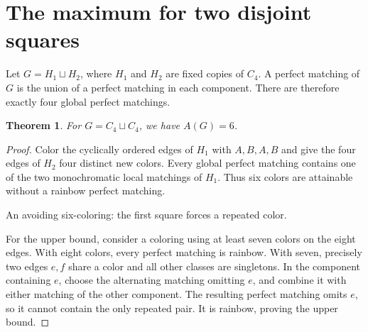 \documentclass[11pt,letterpaper]{article}
\newtheorem{theorem}{Theorem}
\begin{document}
\newpage
\section{The maximum for two disjoint squares}
Let $G=H_1\sqcup H_2$, where $H_1$ and $H_2$ are fixed copies of $C_4$.
A perfect matching of $G$ is the union of a perfect matching in each
component. There are therefore exactly four global perfect matchings.

\begin{theorem}\label{thm:squares-bound}
For $G=C_4\sqcup C_4$, we have $A(G)=6$.
\end{theorem}

\begin{proof}
Color the cyclically ordered edges of $H_1$ with $A,B,A,B$ and give the four
edges of $H_2$ four distinct new colors. Every global perfect matching
contains one of the two monochromatic local matchings of $H_1$.
Thus six colors are attainable without a rainbow perfect matching.

\begin{center}

\small An avoiding six-coloring: the first square forces a repeated color.
\end{center}

For the upper bound, consider a coloring using at least seven colors on
the eight edges. With eight colors, every perfect matching is rainbow.
With seven, precisely two edges $e,f$ share a color and all other classes
are singletons. In the component containing $e$, choose the alternating
matching omitting $e$, and combine it with either matching of the other
component. The resulting perfect matching omits $e$, so it cannot contain
the only repeated pair. It is rainbow, proving the upper bound.
\end{proof}
\end{document}
